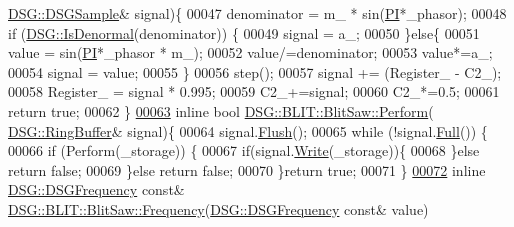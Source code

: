 \begin{DoxyCode}
      \hyperlink{namespace_d_s_g_ac39a94cd27ebcd9c1e7502d0c624894a}{DSG::DSGSample}& signal)\{
00047             denominator = m\_ * sin(\hyperlink{_p_i_8h_a598a3330b3c21701223ee0ca14316eca}{PI}*\_phasor);
00048             \textcolor{keywordflow}{if} (\hyperlink{namespace_d_s_g_a9eee3c39a1f45d42f0b4fa7201d3ba3d}{DSG::IsDenormal}(denominator)) \{
00049                 signal = a\_;
00050             \}\textcolor{keywordflow}{else}\{
00051                 value = sin(\hyperlink{_p_i_8h_a598a3330b3c21701223ee0ca14316eca}{PI}*\_phasor * m\_);
00052                 value/=denominator;
00053                 value*=a\_;
00054                 signal = value;
00055             \}
00056             step();
00057             signal += (Register\_ - C2\_);
00058             Register\_ = signal * 0.995;
00059             C2\_+=signal;
00060             C2\_*=0.5;
00061             \textcolor{keywordflow}{return} \textcolor{keyword}{true};
00062         \}
\hypertarget{_b_l_i_t_saw_8h_source_l00063}{}\hyperlink{class_d_s_g_1_1_b_l_i_t_1_1_blit_saw_ad2edba8ed83558e76afed6ec1d5cf4d6}{00063}         \textcolor{keyword}{inline} \textcolor{keywordtype}{bool} \hyperlink{class_d_s_g_1_1_b_l_i_t_1_1_blit_saw_ae24821c51b23b9fe9220a620e558af04}{DSG::BLIT::BlitSaw::Perform}(
      \hyperlink{class_d_s_g_1_1_ring_buffer}{DSG::RingBuffer}& signal)\{
00064             signal.\hyperlink{class_d_s_g_1_1_ring_buffer_ab23c8003d2857809a816068eeb209d60}{Flush}();
00065             \textcolor{keywordflow}{while} (!signal.\hyperlink{class_d_s_g_1_1_ring_buffer_a53ddb04ffcbb5470a8d2b0a3c65b70cb}{Full}()) \{
00066                 \textcolor{keywordflow}{if} (Perform(\_storage)) \{
00067                     \textcolor{keywordflow}{if}(signal.\hyperlink{class_d_s_g_1_1_ring_buffer_aa5dd2caa0a270173251faee40a43d692}{Write}(\_storage))\{
00068                     \}\textcolor{keywordflow}{else} \textcolor{keywordflow}{return} \textcolor{keyword}{false};
00069                 \}\textcolor{keywordflow}{else} \textcolor{keywordflow}{return} \textcolor{keyword}{false};
00070             \}\textcolor{keywordflow}{return} \textcolor{keyword}{true};
00071         \}
\hypertarget{_b_l_i_t_saw_8h_source_l00072}{}\hyperlink{class_d_s_g_1_1_b_l_i_t_1_1_blit_saw_a290d01796efca84b73eb61a3bc419ebb}{00072}         \textcolor{keyword}{inline} \hyperlink{namespace_d_s_g_a4315a061386fa1014fda09b15d3a6973}{DSG::DSGFrequency} \textcolor{keyword}{const}& 
      \hyperlink{class_d_s_g_1_1_signal_generator_a4e6b3c43e76e53f8cd337ad699c464cb}{DSG::BLIT::BlitSaw::Frequency}(\hyperlink{namespace_d_s_g_a4315a061386fa1014fda09b15d3a6973}{DSG::DSGFrequency} \textcolor{keyword}{const}& value)

\end{DoxyCode}
